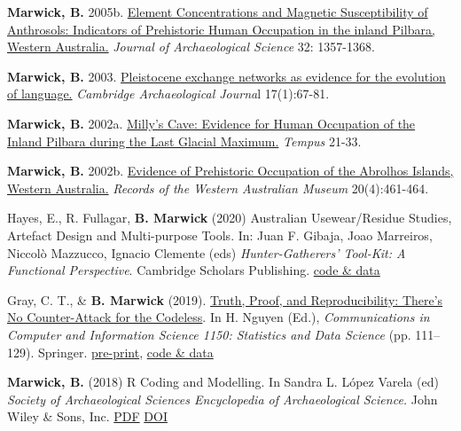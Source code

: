 \documentclass[11pt,article,oneside]{memoir}
\begin{document}
{{{{\ind \textbf{Marwick, B.} 2005b. \href{http://faculty.washington.edu/bmarwick/PDFs/Marwick_2005_JAS.pdf}{Element Concentrations and Magnetic Susceptibility of Anthrosols: Indicators of Prehistoric Human Occupation in the inland Pilbara, Western Australia.} \textit{Journal of Archaeological Science} 32: 1357-1368.

\ind \textbf{Marwick, B.} 2003. \href{http://faculty.washington.edu/bmarwick/PDFs/Marwick_2003_CAJ.pdf}{Pleistocene exchange networks as evidence for the evolution of language.} \textit{Cambridge Archaeological Journa}l 17(1):67-81.

\ind \textbf{Marwick, B.} 2002a. \href{http://faculty.washington.edu/bmarwick/PDFs/Marwick_2002_Tempus.pdf}{Milly's Cave: Evidence for Human Occupation of the Inland Pilbara during the Last Glacial Maximum.} \textit{Tempus} 21-33.

\ind \textbf{Marwick, B.} 2002b. \href{http://faculty.washington.edu/bmarwick/PDFs/Marwick_2002_RWAM.pdf}{Evidence of Prehistoric Occupation of the Abrolhos Islands, Western Australia.} \textit{Records of the Western Australian Museum} 20(4):461-464.

\bigskip


\ind Hayes, E., R. Fullagar, \textbf{B. Marwick} (2020) Australian Usewear/Residue Studies, Artefact Design and Multi-purpose Tools. In: Juan F. Gibaja, Joao Marreiros, Niccolò Mazzucco, Ignacio Clemente (eds) \textit{Hunter-Gatherers’ Tool-Kit: A Functional Perspective}. Cambridge Scholars Publishing. \href{https://doi.org/x10.17605/OSF.IO/MYBG2}{code \& data}

\ind Gray, C. T., \& \textbf{B. Marwick} (2019). \href{https://doi.org/10.1007/978-981-15-1960-4_8}{Truth, Proof, and Reproducibility: There’s No Counter-Attack for the Codeless}. In H. Nguyen (Ed.), \textit{Communications in Computer and Information Science 1150: Statistics and Data Science} (pp. 111–129). Springer.  \href{https://arxiv.org/abs/1907.05947}{pre-print}, \href{https://github.com/softloud/proof}{code \& data}

\ind \textbf{Marwick, B.} (2018) R Coding and Modelling. In Sandra L. López Varela (ed) \textit{Society of Archaeological Sciences Encyclopedia of Archaeological Science.}  John Wiley & Sons, Inc. \href{http://faculty.washington.edu/bmarwick/PDFs/Marwick-2018-R-Coding-and-Modeling-The-Encyclopedia-of-Archaeological-Sciences.pdf}{PDF} \href{https://doi.org/10.1002/9781119188230.saseas0631}{DOI}

}}}}
\end{document}
